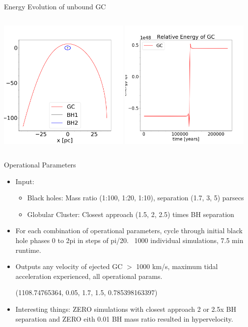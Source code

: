 \documentclass[aspectratio=169]{beamer}
\begin{document}
\begin{frame}
  {Energy Evolution of unbound GC}
  \begin{columns}
    \includegraphics[width=6.4cm, height=6.4cm]{./Images/unbound_track.png}
    \includegraphics[width=6.4cm, height=6.4cm]{./Images/unbound_energy.png}
  \end{columns}
\end{frame}

\begin{frame}
  {Operational Parameters}
    \begin{itemize}
    \item Input: 
      \begin{itemize}
      \item Black holes: Mass ratio (1:100, 1:20, 1:10), separation (1.7, 3, 5) parsecs
      \item Globular Cluster: Closest approach (1.5, 2, 2.5) times BH separation
      \end{itemize}
    \item For each combination of operational parameters, cycle through initial black hole phases 0 to 2pi in steps of pi/20. ~1000 individual simulations, 7.5 min runtime.
    \item Outputs any velocity of ejected GC $>$ 1000 km/s, maximum tidal acceleration experienced, all operational params.
    
      (1108.74765364, 0.05, 1.7, 1.5, 0.785398163397)
    \item Interesting things: ZERO simulations with closest approach 2 or 2.5x BH separation and ZERO eith 0.01 BH mass ratio resulted in hypervelocity. 
    \end{itemize}
\end{frame}
\end{document}
